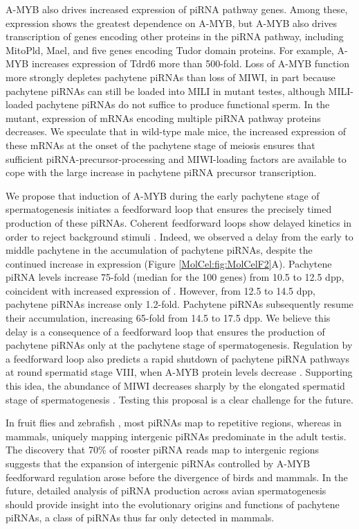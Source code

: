   A-MYB also drives increased expression of piRNA pathway genes. Among these, \miwi{} expression shows the greatest dependence on A-MYB, but A-MYB also drives transcription of genes encoding other proteins in the piRNA pathway, including MitoPld, Mael, and five genes encoding Tudor domain proteins. For example, A-MYB increases expression of Tdrd6 more than 500-fold. Loss of A-MYB function more strongly depletes pachytene piRNAs than loss of MIWI, in part because pachytene piRNAs can still be loaded into MILI in \miwi{} mutant testes, although MILI-loaded pachytene piRNAs do not suffice to produce functional sperm. In the \amyb{} mutant, expression of mRNAs encoding multiple piRNA pathway proteins decreases. We speculate that in wild-type male mice, the increased expression of these mRNAs at the onset of the pachytene stage of meiosis ensures that sufficient piRNA-precursor-processing and MIWI-loading factors are available to cope with the large increase in pachytene piRNA precursor transcription.

  We propose that induction of A-MYB during the early pachytene stage of spermatogenesis initiates a feedforward loop that ensures the precisely timed production of these piRNAs. Coherent feedforward loops show delayed kinetics in order to reject background stimuli \citep{Mangan2003}. Indeed, we observed a delay from the early to middle pachytene in the accumulation of pachytene piRNAs, despite the continued increase in \amyb{} expression (Figure \ref{MolCel:fig:MolCelF2}A). Pachytene piRNA levels increase 75-fold (median for the 100 genes) from 10.5 to 12.5 dpp, coincident with increased expression of \amyb{}. However, from 12.5 to 14.5 dpp, pachytene piRNAs increase only 1.2-fold. Pachytene piRNAs subsequently resume their accumulation, increasing 65-fold from 14.5 to 17.5 dpp. We believe this delay is a consequence of a feedforward loop that ensures the production of pachytene piRNAs only at the pachytene stage of spermatogenesis. Regulation by a feedforward loop also predicts a rapid shutdown of pachytene piRNA pathways at round spermatid stage VIII, when A-MYB protein levels decrease \citep{Horvath2009}. Supporting this idea, the abundance of MIWI decreases sharply by the elongated spermatid stage of spermatogenesis \citep{Deng2002c}. Testing this proposal is a clear challenge for the future.

  In fruit flies and zebrafish \citep{Brennecke2007, Houwing2007}, most piRNAs map to repetitive regions, whereas in mammals, uniquely mapping intergenic piRNAs predominate in the adult testis. The discovery that 70\% of rooster piRNA reads map to intergenic regions suggests that the expansion of intergenic piRNAs controlled by A-MYB feedforward regulation arose before the divergence of birds and mammals. In the future, detailed analysis of piRNA production across avian spermatogenesis should provide insight into the evolutionary origins and functions of pachytene piRNAs, a class of piRNAs thus far only detected in mammals.

